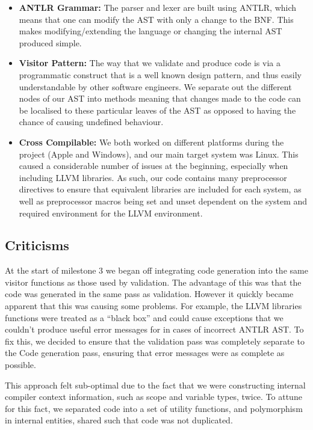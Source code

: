 \documentclass[a4wide, 11pt]{article}
\begin{document}
\begin{itemize}
\item
\textbf{ANTLR Grammar:} The parser and lexer are built using ANTLR, which means that one can modify the AST with only a change to the BNF. This makes modifying/extending the language or changing the internal AST produced simple.
\item
\textbf{Visitor Pattern:} The way that we validate and produce code is via a programmatic construct that is a well known design pattern, and thus easily understandable by other software engineers. We separate out the different nodes of our AST into methods meaning that changes made to the code can be localised to these particular leaves of the AST as opposed to having the chance of causing undefined behaviour. 
\item
\textbf{Cross Compilable:} We both worked on different platforms during the project (Apple and Windows), and our main target system was Linux. This caused a considerable number of issues at the beginning, especially when including LLVM libraries. As such, our code contains many preprocessor directives to ensure that equivalent libraries are included for each system, as well as preprocessor macros being set and unset dependent on the system and required environment for the LLVM environment.
\end{itemize}

\subsection{Criticisms}

At the start of milestone 3 we began off integrating code generation into the same visitor functions as those used by validation. The advantage of this was that the code was generated in the same pass as validation. However it quickly became apparent that this was causing some problems. For example, the LLVM libraries functions were treated as a ``black box'' and could cause exceptions that we couldn't produce useful error messages for in cases of incorrect ANTLR AST. To fix this, we decided to ensure that the validation pass was completely separate to the Code generation pass, ensuring that error messages were as complete as possible.

This approach felt sub-optimal due to the fact that we were constructing internal compiler context information, such as scope and variable types, twice. To attune for this fact, we separated code into a set of utility functions, and polymorphism in internal entities, shared such that code was not duplicated.
\end{document}

